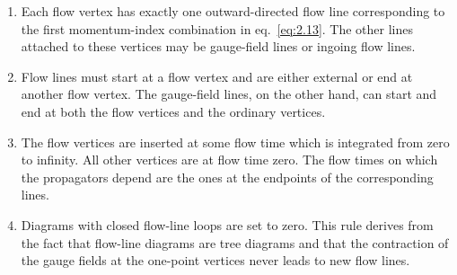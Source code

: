 \begin{enumerate}[label=(\alph*),itemsep=1.0ex,leftmargin=*]
\item Each flow vertex has exactly one outward-directed flow line corresponding
to the first momentum-index combination in eq.~\eqref{eq:2.13}. The other lines
attached to these vertices may be gauge-field lines or ingoing flow lines.

\item Flow lines must start at a
flow vertex and are either external or end at another flow vertex.
The gauge-field lines, on the other hand, can start and end at
both the flow vertices and the ordinary vertices.

\item The flow vertices are inserted at some flow time which is integrated
from zero to infinity. All other vertices are at flow time zero.
The flow times on which the propagators depend are the ones at
the endpoints of the corresponding lines.

\item Diagrams with closed flow-line loops are set to zero.
This rule derives from the fact that flow-line diagrams are tree
diagrams and that the contraction of the gauge fields at the one-point
vertices never leads to new flow lines.
\end{enumerate}
